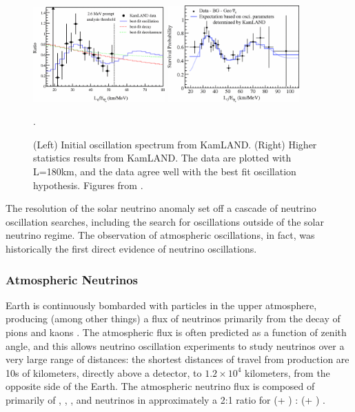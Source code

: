 \begin{figure}[htbp]
  \centering
  \includegraphics[width=0.45\textwidth]{intro_figures/kamland.png}
  \includegraphics[width=0.45\textwidth]{intro_figures/kamland_highstats.png}
  \caption[KamLAND Oscillation Results]{(Left) Initial oscillation spectrum from KamLAND. (Right) Higher statistics results from KamLAND.  The data are plotted with L=180km, and the data agree well with the best fit oscillation hypothesis. Figures from \cite{Araki:2004mb,Abe:2008aa}.}
  \label{fig:kamland}.
\end{figure}

The resolution of the solar neutrino anomaly set off a cascade of neutrino oscillation searches, including the search for oscillations outside of the solar neutrino regime.  The observation of atmospheric oscillations, in fact, was historically the first direct evidence of neutrino oscillations.

\subsubsection{Atmospheric Neutrinos}

Earth is continuously bombarded with particles in the upper atmosphere, producing (among other things) a flux of neutrinos primarily from the decay of pions and kaons \cite{Honda:2004yz, PhysRevD.70.023006, Plyaskin:2001ku}.  The atmospheric flux is often predicted as a function of zenith angle, and this allows neutrino oscillation experiments to study neutrinos over a very large range of distances: the shortest distances of travel from production are 10s of kilometers, directly above a detector, to $1.2 \times 10^4$ kilometers, from the opposite side of the Earth.  The atmospheric neutrino flux is composed of primarily of \numu, \numubar, \nue, and \nuebar neutrinos in approximately a 2:1 ratio for (\numu + \numubar) : (\nue + \nuebar) \cite{pdg}.

